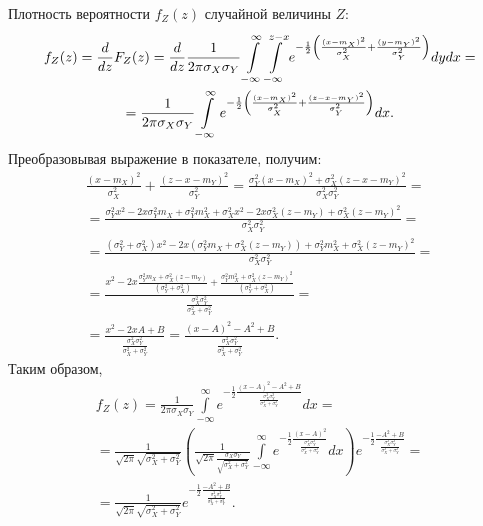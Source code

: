 Плотность вероятности $f_Z(z)$ случайной величины $Z$:
\begin{multline}
    f_Z(z)
    = \frac{d}{dz} F_Z(z)
    = \frac{d}{dz} \frac{1}{2 \pi \sigma_X \sigma_Y} \int \limits_{-\infty}^\infty \int \limits_{-\infty}^{z-x} e^{- \frac{1}{2} \left ( \frac{(x - m_X)^2}{\sigma_X^2} + \frac{(y - m_Y)^2}{\sigma_Y^2} \right )} dy dx = \\
    = \frac{1}{2 \pi \sigma_X \sigma_Y} \int \limits_{-\infty}^\infty e^{- \frac{1}{2} \left ( \frac{(x - m_X)^2}{\sigma_X^2} + \frac{(z - x - m_Y)^2}{\sigma_Y^2} \right )} dx .
\end{multline}
Преобразовывая выражение в показателе, получим:
\begin{multline}
    \frac{(x - m_X)^2}{\sigma_X^2} + \frac{(z - x - m_Y)^2}{\sigma_Y^2}
    = \frac{\sigma_Y^2 ( x - m_X )^2 + \sigma_X^2 (z - x - m_Y)^2}{\sigma_X^2 \sigma_Y^2} = \\
    = \frac{\sigma_Y^2 x^2 - 2 x \sigma_Y^2 m_X + \sigma_Y^2 m_X^2 + \sigma_X^2 x^2 - 2 x \sigma_X^2 (z - m_Y) + \sigma_X^2 (z - m_Y)^2}{\sigma_X^2 \sigma_Y^2} = \\
    = \frac{(\sigma_Y^2 + \sigma_X^2) x^2 - 2 x ( \sigma_Y^2 m_X + \sigma_X^2 (z - m_Y) ) + \sigma_Y^2 m_X^2 + \sigma_X^2 (z - m_Y)^2}{\sigma_X^2 \sigma_Y^2} = \\
    = \frac{x^2 - 2 x \frac{\sigma_Y^2 m_X + \sigma_X^2 (z - m_Y)}{(\sigma_Y^2 + \sigma_X^2)} + \frac{\sigma_Y^2 m_X^2 + \sigma_X^2 (z - m_Y)^2}{(\sigma_Y^2 + \sigma_X^2)}}{\frac{\sigma_X^2 \sigma_Y^2}{\sigma_X^2 + \sigma_Y^2}} = \\
    = \frac{x^2 - 2 x A + B}{\frac{\sigma_X^2 \sigma_Y^2}{\sigma_X^2 + \sigma_Y^2}}
    = \frac{\left ( x - A \right )^2 - A^2 + B}{\frac{\sigma_X^2 \sigma_Y^2}{\sigma_X^2 + \sigma_Y^2}} .
\end{multline}
Таким образом,
\begin{multline}
    f_Z(z)
    = \frac{1}{2 \pi \sigma_X \sigma_Y} \int \limits_{-\infty}^\infty e^{ -\frac{1}{2} \frac{\left ( x - A \right )^2 - A^2 + B}{\frac{\sigma_X^2 \sigma_Y^2}{\sigma_X^2 + \sigma_Y^2}}} dx = \\
    = \frac{1}{\sqrt{2 \pi} \sqrt{\sigma_X^2 + \sigma_Y^2}} \left ( \frac{1}{\sqrt{2 \pi} \frac{\sigma_X \sigma_Y}{\sqrt{\sigma_X^2 + \sigma_Y^2}}} \int \limits_{-\infty}^\infty e^{ - \frac{1}{2} \frac{\left ( x - A \right )^2}{\frac{\sigma_X^2 \sigma_Y^2}{\sigma_X^2 + \sigma_Y^2}}} dx \right ) e^{ -\frac{1}{2} \frac{ - A^2 + B}{\frac{\sigma_X^2 \sigma_Y^2}{\sigma_X^2 + \sigma_Y^2}}}= \\
    = \frac{1}{\sqrt{2 \pi} \sqrt{\sigma_X^2 + \sigma_Y^2}} e^{ -\frac{1}{2} \frac{- A^2 + B}{\frac{\sigma_X^2 \sigma_Y^2}{\sigma_X^2 + \sigma_Y^2}}} .
\end{multline}
